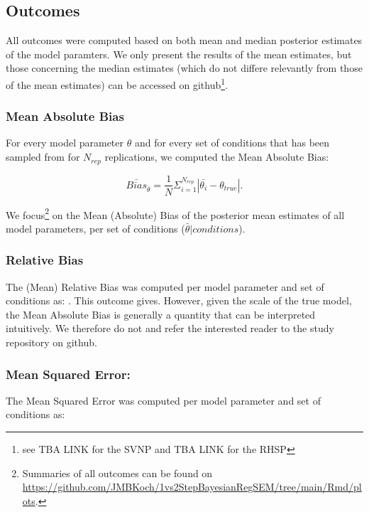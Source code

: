 \documentclass[
  man, donotrepeattitle,floatsintext]{apa6}
\begin{document}
\hypertarget{outcomes}{%
\subsection{Outcomes}\label{outcomes}}

All outcomes were computed based on both mean and median posterior estimates of the model paramters. We only present the results of the mean estimates, but those concerning the median estimates (which do not differe relevantly from those of the mean estimates) can be accessed on github\footnote{see TBA LINK for the SVNP and TBA LINK for the RHSP}.

\hypertarget{mean-absolute-bias}{%
\subsubsection{Mean Absolute Bias}\label{mean-absolute-bias}}

For every model parameter \(\theta\) and for every set of conditions that has been sampled from for \(N_{rep}\) replications, we computed the Mean Absolute Bias:

\[\bar{Bias}_{\bar{\theta}} = \frac{1}{N} \Sigma_{i = 1}^{N_{rep}} |\bar{\theta_i} - \theta_{true}|.\]

We focus\footnote{ Summaries of all outcomes can be found on \url{https://github.com/JMBKoch/1vs2StepBayesianRegSEM/tree/main/Rmd/plots}.} on the Mean (Absolute) Bias of the posterior mean estimates of all model parameters, per set of conditions (\(\bar{\theta} | conditions\)).

\hypertarget{relative-bias}{%
\subsubsection{Relative Bias}\label{relative-bias}}

The (Mean) Relative Bias was computed per model parameter and set of conditions as: . This outcome gives. However, given the scale of the true model, the Mean Absolute Bias is generally a quantity that can be interpreted intuitively. We therefore do not and refer the interested reader to the study repository on github.

\hypertarget{mean-squared-error}{%
\subsubsection{Mean Squared Error:}\label{mean-squared-error}}

The Mean Squared Error was computed per model parameter and set of conditions as:
\end{document}
